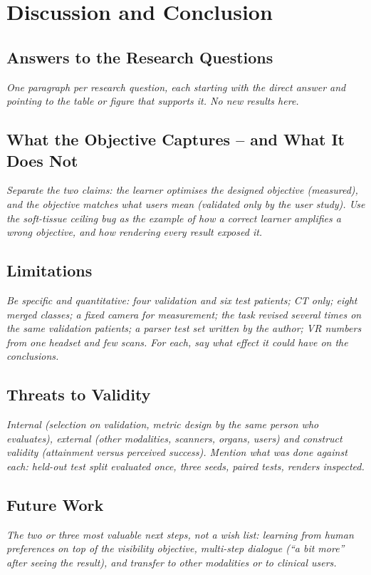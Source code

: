 \documentclass[12pt, a4paper]{book}
\newcommand{\plan}[1]{{\color{gray}\itshape #1\par}}
\begin{document}
\chapter{Discussion and Conclusion}
\label{ch:discussion}

\section{Answers to the Research Questions}
\label{sec:disc-answers}
\plan{One paragraph per research question, each starting with the direct answer and pointing to the table or figure that supports it. No new results here.}

\section{What the Objective Captures -- and What It Does Not}
\label{sec:disc-objective}
\plan{Separate the two claims: the learner optimises the designed objective (measured), and the objective matches what users mean (validated only by the user study). Use the soft-tissue ceiling bug as the example of how a correct learner amplifies a wrong objective, and how rendering every result exposed it.}

\section{Limitations}
\label{sec:disc-limitations}
\plan{Be specific and quantitative: four validation and six test patients; CT only; eight merged classes; a fixed camera for measurement; the task revised several times on the same validation patients; a parser test set written by the author; VR numbers from one headset and few scans. For each, say what effect it could have on the conclusions.}

\section{Threats to Validity}
\label{sec:disc-validity}
\plan{Internal (selection on validation, metric design by the same person who evaluates), external (other modalities, scanners, organs, users) and construct validity (attainment versus perceived success). Mention what was done against each: held-out test split evaluated once, three seeds, paired tests, renders inspected.}

\section{Future Work}
\label{sec:disc-future}
\plan{The two or three most valuable next steps, not a wish list: learning from human preferences on top of the visibility objective, multi-step dialogue (``a bit more'' after seeing the result), and transfer to other modalities or to clinical users.}
\end{document}
